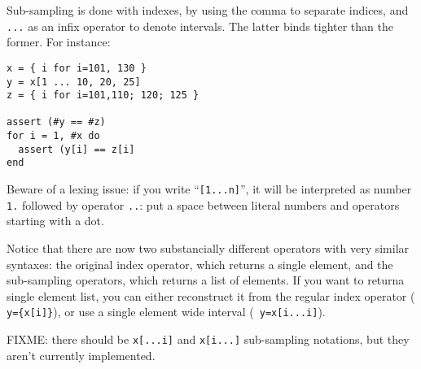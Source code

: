 Sub-sampling is done with indexes, by using the comma to separate
indices, and {\tt...} as an infix operator to denote intervals. The
latter binds tighter than the former. For instance:

\begin{verbatim}
x = { i for i=101, 130 }
y = x[1 ... 10, 20, 25]
z = { i for i=101,110; 120; 125 }

assert (#y == #z)
for i = 1, #x do
  assert (y[i] == z[i]
end
\end{verbatim}

Beware of a lexing issue: if you write ``{\tt[1...n]}'', it will be
interpreted as number {\tt 1.} followed by operator {\tt..}: put a
space between literal numbers and operators starting with a dot.

Notice that there are now two substancially different operators with
very similar syntaxes: the original index operator, which returns a
single element, and the sub-sampling operators, which returns a list
of elements. If you want to returna single element list, you can
either reconstruct it from the regular index operator ({\tt
  y=\{x[i]\}}), or use a single element wide interval ({\tt
  y=x[i...i]}).

FIXME: there should be \verb|x[...i]| and \verb|x[i...]| sub-sampling
notations, but they aren't currently implemented.

